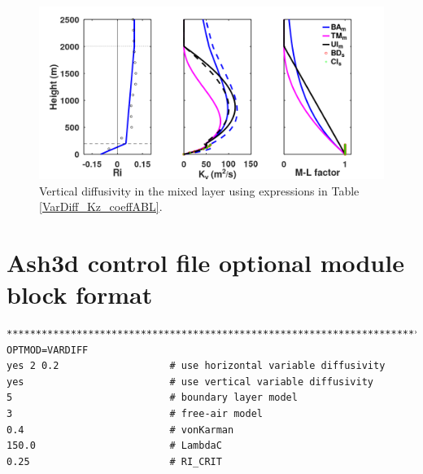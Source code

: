 \begin{figure}[htbp]\vspace*{0cm}\hspace*{0cm}
\includegraphics[angle=0,scale=0.5]{Figures/Apx_VarDiff/Kv_ML.png}
\parbox{15cm}{\caption{\label{FigVarDiff_Kv_MixingLayer}
Vertical diffusivity in the mixed layer using expressions in Table \ref{VarDiff_Kz_coeffABL}.
}}
\end{figure}



\section{Ash3d control file optional module block format}\label{ChapAppendVarDiff_SecContrlBlock}

\footnotesize
\begin{verbatim}
*******************************************************************************
OPTMOD=VARDIFF
yes 2 0.2                   # use horizontal variable diffusivity
yes                         # use vertical variable diffusivity
5                           # boundary layer model
3                           # free-air model
0.4                         # vonKarman
150.0                       # LambdaC
0.25                        # RI_CRIT
\end{verbatim}
\normalsize



